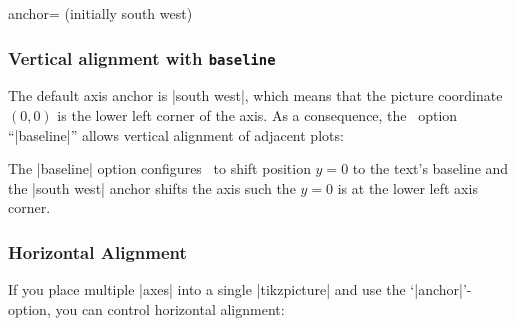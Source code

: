 \begin{pgfplotskey}{anchor= (initially south west)}
\subsubsection{Vertical alignment with \texttt{baseline}}
\label{sec:align}%
The default axis anchor is |south west|, which means that the picture coordinate $(0,0)$ is the lower left corner of the axis. As a consequence, the \Tikz\ option ``|baseline|'' allows vertical alignment of adjacent plots:
\begin{codeexample}[]
\pgfplotsset{domain=-1:1}
%
\hspace{0.15cm}
\end{codeexample}

\begin{codeexample}[]
\pgfplotsset{domain=-1:1}
%
\hspace{0.15cm}
\end{codeexample}
The |baseline| option configures \Tikz\ to shift position $y=0$ to the text's baseline and the |south west| anchor shifts the axis such the $y=0$ is at the lower left axis corner.

\subsubsection{Horizontal Alignment}
\label{sec:halign}%
If you place multiple |axes| into a single |tikzpicture| and use the `|anchor|'-option, you can control horizontal alignment:
\begin{codeexample}[]
\end{codeexample}
\end{pgfplotskey}
